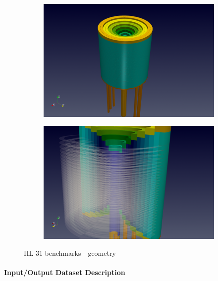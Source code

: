 \begin{figure}[!ht]
  \centering
  \begin{subfigure}[c]{0.49\textwidth}
    \centering
    \includegraphics[width=\textwidth]{graphics/feelpp/feelpp-benchmark-HL-31-geo.png}
  \end{subfigure}
  \hfill
  \begin{subfigure}[c]{0.49\textwidth}
    \centering
    \includegraphics[width=\textwidth]{graphics/feelpp/feelpp-benchmark-HL-31-geo-zoom.png}
  \end{subfigure}
  \caption{HL-31 benchmarks - geometry}
  \label{fig:wp1:feelpp:hl-31:visualization-geometry}
\end{figure}



\paragraph{Input/Output Dataset Description}

